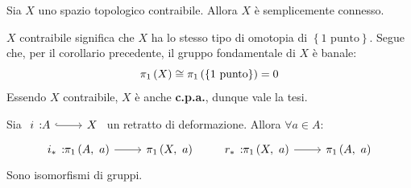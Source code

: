 \begin{corollary}
	Sia $X$ uno spazio topologico contraibile. Allora $X$ è semplicemente connesso.
\end{corollary}
\begin{demonstration}
	$X$ contraibile significa che $X$ ha lo stesso tipo di omotopia di $\left\{1\text{ punto}\right\}$. Segue che, per il corollario precedente, il gruppo fondamentale di $X$ è banale:
	\begin{equation*}
		\gruf{X}{\ }\cong\gruf{\left\{1\text{ punto}\right\}}{\ }=0
	\end{equation*}
	Essendo $X$ contraibile, $X$ è anche \textbf{c.p.a.}, dunque vale la tesi.
\end{demonstration}
\begin{corollary}
	Sia $\incl{i}{A}{X}$ un retratto di deformazione. Allora $\forall a\in A$:
	\begin{equation}
		\funz{i_{\ast}}{\gruf{A}{a}}{\gruf{X}{a}}\qquad\funz{r_{\ast}}{\gruf{X}{a}}{\gruf{A}{a}}
	\end{equation}
Sono isomorfismi di gruppi.
\vspace{-6mm}
\end{corollary}